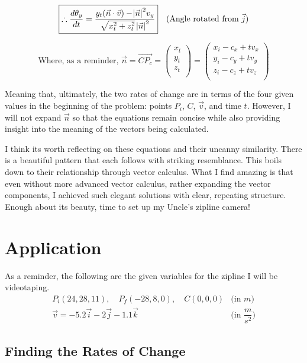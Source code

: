 \documentclass[12pt]{article}
\begin{document}
\begin{equation}
    \boxed{\therefore \frac{d\theta_y}{dt} = \frac{y_t(\vec n \cdot \vec v) - {\abs{\vec n}}^2 v_y}{\sqrt{x_t^2 + z_t^2} {\;\abs{\vec n}}^2}} \quad \text{(Angle rotated from } \vec j \text{)}
\end{equation}

$$\text{Where, as a reminder, } \vec n = \overrightarrow{CP_c} = \begin{pmatrix} x_t \\ y_t \\ z_t \\ \end{pmatrix} = \begin{pmatrix} x_i-c_x+tv_x \\ y_i-c_y + tv_y \\ z_i-c_z + tv_z \\ \end{pmatrix}$$

Meaning that, ultimately, the two rates of change are in terms of the four given values in the beginning of the problem: points $P_i$, $C$, $\vec v$, and time $t$. However, I will not expand $\vec n$ so that the equations remain concise while also providing insight into the meaning of the vectors being calculated.

I think its worth reflecting on these equations and their uncanny similarity. There is a beautiful pattern that each follows with striking resemblance. This boils down to their relationship through vector calculus. What I find amazing is that even without more advanced vector calculus, rather expanding the vector components, I achieved such elegant solutions with clear, repeating structure. Enough about its beauty, time to set up my Uncle's zipline camera!

\section{Application}

As a reminder, the following are the given variables for the zipline I will be videotaping.
$$
\begin{array}{c|c}
    P_i(24,28,11), \quad P_f(-28,8,0), \quad C(0,0,0) & \text{(in }m\text{)} \\
    \vec v = -5.2\vec i - 2\vec j -1.1 \vec k & \text{(in } \dfrac{m}{s^2} \text{)}  
\end{array}
$$


\subsection{Finding the Rates of Change}
\end{document}
